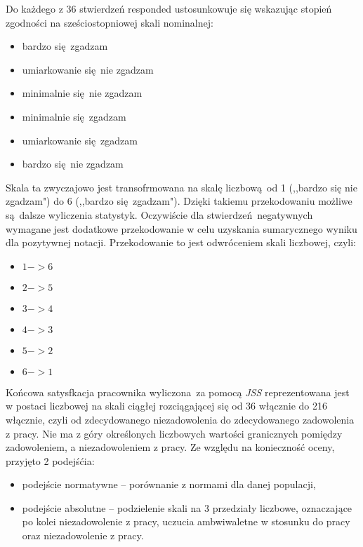 Do każdego z 36 stwierdzeń responded ustosunkowuje się wskazując stopień zgodności na sześciostopniowej skali nominalnej:
\begin{itemize}
\item bardzo się zgadzam
\item umiarkowanie się nie zgadzam
\item minimalnie się nie zgadzam
\item minimalnie się zgadzam
\item umiarkowanie się zgadzam
\item bardzo się nie zgadzam
\end{itemize}
Skala ta zwyczajowo jest transofrmowana na skalę liczbową od 1 (,,bardzo się nie zgadzam") do 6 (,,bardzo się zgadzam"). Dzięki takiemu przekodowaniu możliwe są dalsze wyliczenia statystyk. Oczywiście dla stwierdzeń negatywnych wymagane jest dodatkowe przekodowanie w celu uzyskania sumarycznego wyniku dla pozytywnej notacji. Przekodowanie to jest odwróceniem skali liczbowej, czyli:
\begin{itemize}
\item $ 1 -> 6 $
\item $ 2 -> 5 $
\item $ 3 -> 4 $
\item $ 4 -> 3 $
\item $ 5 -> 2 $
\item $ 6 -> 1 $
\end{itemize}

Końcowa satysfkacja pracownika wyliczona za pomocą \emph{JSS} reprezentowana jest w postaci liczbowej na skali ciągłej rozciągającej się od 36 włącznie do 216 włącznie, czyli od zdecydowanego niezadowolenia do zdecydowanego zadowolenia z pracy. Nie ma z góry określonych liczbowych wartości granicznych pomiędzy zadowoleniem, a niezadowoleniem z pracy. Ze względu na konieczność oceny, przyjęto 2 podejśćia:
\begin{itemize}
\item podejście normatywne -- porównanie z normami dla danej populacji,
\item podejście absolutne -- podzielenie skali na 3 przedziały liczbowe, oznaczające po kolei niezadowolenie z pracy, uczucia ambwiwaletne w stosunku do pracy oraz niezadowolenie z pracy.
\end{itemize}

